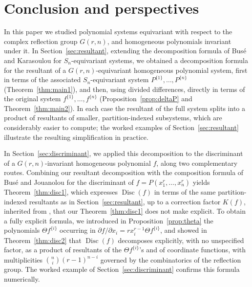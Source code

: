 \documentclass[12pt]{amsart}
\theoremstyle{definition}
\newcommand{\Disc}{\operatorname{Disc}}
\begin{document}
\section{Conclusion and perspectives}
\label{sec:conclusion}

In this paper we studied polynomial systems equivariant with respect to the complex reflection group $G(r,n)$, and homogeneous polynomials invariant under it. In Section~\ref{sec:resultant}, extending the decomposition formula of Bus\'e and Karasoulou \citep{BuseKarasoulou2016} for $S_n$-equivariant systems, we obtained a decomposition formula for the resultant of a $G(r,n)$-equivariant homogeneous polynomial system, first in terms of the associated $S_n$-equivariant system $P^{\{1\}},\dots,P^{\{n\}}$ (Theorem~\ref{thm:main1}), and then, using divided differences, directly in terms of the original system $f^{\{1\}},\dots,f^{\{n\}}$ (Proposition~\ref{prop:deltaP} and Theorem~\ref{thm:main2}). In each case the resultant of the full system splits into a product of resultants of smaller, partition-indexed subsystems, which are considerably easier to compute; the worked examples of Section~\ref{sec:resultant} illustrate the resulting simplification in practice.

In Section~\ref{sec:discriminant}, we applied this decomposition to the discriminant of a $G(r,n)$-invariant homogeneous polynomial $f$, along two complementary routes. Combining our resultant decomposition with the composition formula of Bus\'e and Jouanolou \citep{BuseJouanolou2014} for the discriminant of $f = P(x_1^r,\dots,x_n^r)$ yields Theorem~\ref{thm:disc1}, which expresses $\Disc(f)$ in terms of the same partition-indexed resultants as in Section~\ref{sec:resultant}, up to a correction factor $K(f)$, inherited from \citep{BuseJouanolou2014}, that our Theorem~\ref{thm:disc1} does not make explicit. To obtain a fully explicit formula, we introduced in Proposition~\ref{prop:theta} the polynomials $\Theta f^{\{i\}}$ occurring in $\partial f/\partial x_i = rx_i^{r-1}\Theta f^{\{i\}}$, and showed in Theorem~\ref{thm:disc2} that $\Disc(f)$ decomposes explicitly, with no unspecified factor, as a product of resultants of the $\Theta f^{\{i\}}$'s and of coordinate functions, with multiplicities $\binom{n}{i}(r-1)^{n-i}$ governed by the combinatorics of the reflection group. The worked example of Section~\ref{sec:discriminant} confirms this formula numerically.
\end{document}
